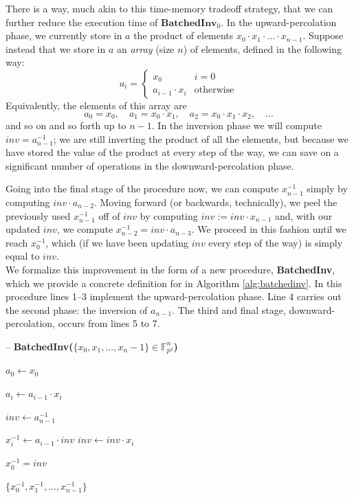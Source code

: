 There is a way, much akin to this time-memory tradeoff strategy, that we can further reduce the execution time of $\textbf{BatchedInv}_0$. In the upward-percolation phase, we currently store in $a$ the product of elements $x_0 \cdot x_1 \cdot ... \cdot x_{n-1}$. Suppose instead that we store in $a$ an \emph{array} (size $n$) of elements, defined in the following way:
$$
a_i =
\begin{cases}
x_0 & i = 0\\
a_{i-1} \cdot x_i & \text{otherwise}
\end{cases}
$$
Equivalently, the elements of this array are
$$
a_0 = x_0, \quad a_1 = x_0 \cdot x_1, \quad a_2 = x_0 \cdot x_1 \cdot x_2, \quad ...
$$
and so on and so forth up to $n-1$. In the inversion phase we will compute $inv = a_{n-1}^{-1}$; we are still inverting the product of all the elements, but because we have stored the value of the product at every step of the way, we can save on a significant number of operations in the downward-percolation phase.

Going into the final stage of the procedure now, we can compute $x_{n-1}^{-1}$ simply by computing $inv \cdot a_{n-2}$. Moving forward (or backwards, technically), we peel the previously used $x_{n-1}^{-1}$ off of $inv$ by computing $inv := inv \cdot x_{n-1}$ and, with our updated $inv$, we compute $x_{n-2}^{-1} = inv \cdot a_{n-3}$. We proceed in this fashion until we reach $x_{0}^{-1}$, which (if we have been updating $inv$ every step of the way) is simply equal to $inv$.\\

We formalize this improvement in the form of a new procedure, \textbf{BatchedInv}, which we provide a concrete definition for in Algorithm \ref{alg:batchedinv}. In this procedure lines 1--3 implement the upward-percolation phase. Line 4 carries out the second phase: the inversion of $a_{n-1}$. The third and final stage, downward-percolation, occurs from lines 5 to 7.

\begin{algorithm}
\caption{-- \textbf{BatchedInv($\{x_0, x_1, ..., x_n-1\} \in \mathbb{F}_{p^{2}}^{n}$)}}\label{alg:batchedinv}
\begin{algorithmic}[1]
\State $a_0 \gets x_0$

	\State $a_i \gets a_{i-1} \cdot x_i$
\EndFor

\State $inv \gets a_{n-1}^{-1}$

	\State $x_i^{-1} \gets a_{i-1} \cdot inv$
	\State $inv \gets inv \cdot x_{i}$
\EndFor

\State $x_0^{-1} = inv$

\State \Return $\{x_0^{-1}, x_1^{-1}, ..., x_{n-1}^{-1}\}$

\end{algorithmic}
\end{algorithm}

